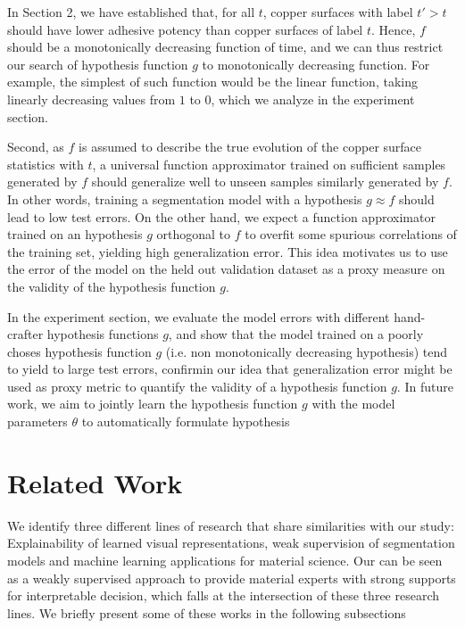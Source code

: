 \documentclass[10pt,twocolumn,letterpaper]{article}
\begin{document}
In Section 2, we have established that, for all $t$, 
copper surfaces with label $t' > t$ should have lower adhesive potency than copper surfaces of label $t$.
Hence, $f$ should be a monotonically decreasing function of time,
and we can thus restrict our search of hypothesis function $g$ to monotonically decreasing function.
For example, the simplest of such function would be the linear function, 
taking linearly decreasing values from $1$ to $0$,
which we analyze in the experiment section.

Second, as $f$ is assumed to describe the true evolution of the copper surface statistics with $t$,
a universal function approximator trained on sufficient samples generated by $f$ 
should generalize well to unseen samples similarly generated by $f$.
In other words, training a segmentation model with a hypothesis $g \approx f$ should lead to low test errors.
On the other hand, we expect a function approximator trained on an hypothesis $g$ orthogonal to $f$ to 
overfit some spurious correlations of the training set, yielding high generalization error. 
This idea motivates us to use the error of the model on the held out validation dataset as a proxy measure on
the validity of the hypothesis function $g$.

In the experiment section, we evaluate the model errors with different hand-crafter hypothesis functions $g$,
and show that the model trained on a poorly choses hypothesis function $g$ (i.e. non monotonically decreasing hypothesis) 
tend to yield to large test errors, confirmin our idea that generalization error might be used as proxy metric
to quantify the validity of a hypothesis function $g$.
In future work, we aim to jointly learn the hypothesis function $g$ with the model parameters $\theta$ to automatically
formulate hypothesis

\section{Related Work}

We identify three different lines of research that share similarities with our study:
Explainability of learned visual representations, 
weak supervision of segmentation models and 
machine learning applications for material science.
Our can be seen as a weakly supervised approach to provide material 
experts with strong supports for interpretable decision, 
which falls at the intersection of these three research lines.
We briefly present some of these works in the following subsections
\end{document}

